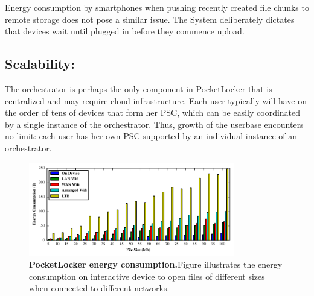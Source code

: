 Energy consumption by smartphones when pushing recently created file chunks to
remote storage does not pose a similar issue.  The System deliberately dictates
that devices wait until plugged in before they commence upload.

\subsection{Scalability:\space} The orchestrator is perhaps the only component
in PocketLocker that is centralized and may require cloud infrastructure. Each
user typically will
have on the order of tens of devices that form her PSC, which can be easily
coordinated by a single instance of the orchestrator. Thus, growth of the userbase
encounters no limit: each user has her own PSC supported by an individual instance of
an orchestrator.


\begin{figure}[t]
  \centering
  \includegraphics[width=0.8\textwidth]{./figures/energyconsumption.pdf}
  
  \vspace*{-0.1in}

  \caption{\small \textbf{PocketLocker energy consumption.}Figure illustrates the energy
  consumption on interactive device to open files of different sizes when
    connected to different networks.}

  \label{fig-evaluation-energy}
  
  \vspace*{0.05in}


  \vspace*{-0.2in}

\end{figure}


